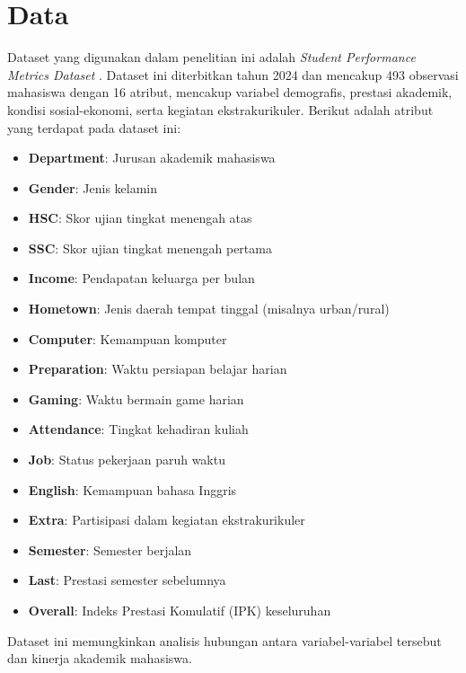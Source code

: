 \section{Data}
Dataset yang digunakan dalam penelitian ini adalah \textit{Student Performance Metrics Dataset} \textcite{Hasan2024}. Dataset ini diterbitkan tahun 2024 dan mencakup 493 observasi mahasiswa dengan 16 atribut, mencakup variabel demografis, prestasi akademik, kondisi sosial-ekonomi, serta kegiatan ekstrakurikuler. Berikut adalah atribut yang terdapat pada dataset ini:

\begin{itemize}
    \item \textbf{Department}: Jurusan akademik mahasiswa
    \item \textbf{Gender}: Jenis kelamin
    \item \textbf{HSC}: Skor ujian tingkat menengah atas
    \item \textbf{SSC}: Skor ujian tingkat menengah pertama
    \item \textbf{Income}: Pendapatan keluarga per bulan
    \item \textbf{Hometown}: Jenis daerah tempat tinggal (misalnya urban/rural)
    \item \textbf{Computer}: Kemampuan komputer
    \item \textbf{Preparation}: Waktu persiapan belajar harian
    \item \textbf{Gaming}: Waktu bermain game harian
    \item \textbf{Attendance}: Tingkat kehadiran kuliah
    \item \textbf{Job}: Status pekerjaan paruh waktu
    \item \textbf{English}: Kemampuan bahasa Inggris
    \item \textbf{Extra}: Partisipasi dalam kegiatan ekstrakurikuler
    \item \textbf{Semester}: Semester berjalan
    \item \textbf{Last}: Prestasi semester sebelumnya
    \item \textbf{Overall}: Indeks Prestasi Komulatif (IPK) keseluruhan
\end{itemize}

Dataset ini memungkinkan analisis hubungan antara variabel-variabel tersebut dan kinerja akademik mahasiswa.
